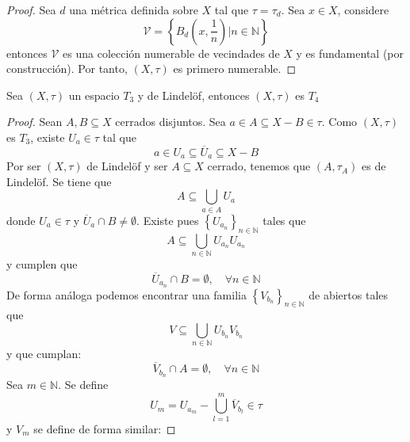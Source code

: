\documentclass[12pt]{report}
\theoremstyle{largebreak}
\begin{document}
    \begin{proof}
        Sea $d$ una métrica definida sobre $X$ tal que $\tau=\tau_d$. Sea $x\in X$, considere
        \begin{equation*}
            \mathcal{V}=\left\{B_d\left(x,\frac{1}{n}\right)\Big|n\in\mathbb{N} \right\}
        \end{equation*}
        entonces $\mathcal{V}$ es una colección numerable de vecindades de $X$ y es fundamental (por construcción). Por tanto, $(X,\tau)$ es primero numerable.
    \end{proof}

    \begin{propo}
        Sea $(X,\tau)$ un espacio $T_3$ y de Lindelöf, entonces $(X,\tau)$ es $T_4$
    \end{propo}

    \begin{proof}
        Sean $A,B\subseteq X$ cerrados disjuntos. Sea $a\in A\subseteq X-B\in\tau$. Como $(X,\tau)$ es $T_3$, existe $U_a\in\tau$ tal que
        \begin{equation*}
            a\in U_a\subseteq\overline{U}_a\subseteq X-B
        \end{equation*}
        Por ser $(X,\tau)$ de Lindelöf y ser $A\subseteq X$ cerrado, tenemos que $(A,\tau_A)$ es de Lindelöf. Se tiene que
        \begin{equation*}
            A\subseteq\bigcup_{ a\in A}U_a
        \end{equation*}
        donde $U_a\in\tau$ y $\overline{U}_a\cap B\neq\emptyset$. Existe pues $\left\{U_{ a_n} \right\}_{ n\in\mathbb{N}}$ tales que
        \begin{equation*}
            A\subseteq\bigcup_{ n\in\mathbb{N}}U_{ a_n}U_{ a_n}
        \end{equation*}
        y cumplen que
        \begin{equation*}
            \overline{U}_{ a_n}\cap B=\emptyset,\quad\forall n\in\mathbb{N}
        \end{equation*}
        De forma análoga podemos encontrar una familia $\left\{V_{ b_n} \right\}_{ n\in\mathbb{N}}$ de abiertos tales que
        \begin{equation*}
            V\subseteq\bigcup_{ n\in\mathbb{N}}U_{ b_n}V_{ b_n}
        \end{equation*}
        y que cumplan:
        \begin{equation*}
            \overline{V}_{ b_n}\cap A=\emptyset,\quad\forall n\in\mathbb{N}
        \end{equation*}
        Sea $m\in\mathbb{N}$. Se define
        \begin{equation*}
            U_m=U_{ a_m}-\bigcup_{ l=1}^m\overline{V}_{b_l}\in\tau
        \end{equation*}
        y $V_m$ se define de forma similar:
    \end{proof}
\end{document}
